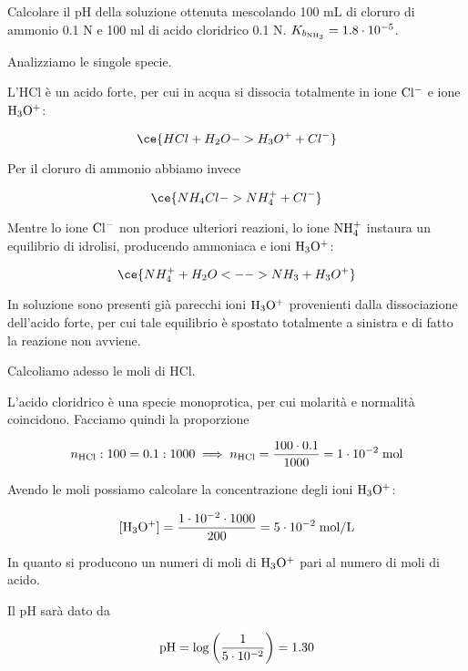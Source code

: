 \begin{esercizio}
    Calcolare il pH della soluzione ottenuta mescolando 100 mL di cloruro di ammonio 0.1 N e 100 ml di acido cloridrico 0.1 N. $K_{b_{\rm NH_3}}=1.8 \cdot 10^{-5}$.
\end{esercizio}
\begin{soluzione}
    Analizziamo le singole specie.

L'HCl è un acido forte, per cui in acqua si dissocia totalmente in ione $\rm Cl^-$ e ione $\rm H_3O^+$:

$$\ce{HCl + H_2O -> H_3O^+ + Cl^-}$$

Per il cloruro di ammonio abbiamo invece

$$\ce{NH_4Cl -> NH_4^+ + Cl^-}$$

Mentre lo ione $\rm Cl^-$ non produce ulteriori reazioni, lo ione $\rm NH_4^+$ instaura un equilibrio di idrolisi, producendo ammoniaca e ioni $\rm H_3O^+$:

$$\ce{NH_4^+ + H_2O <--> NH_3 + H_3O^+}$$

In soluzione sono presenti già parecchi ioni $\rm H_3O^+$ provenienti dalla dissociazione dell'acido forte, per cui tale equilibrio è spostato totalmente a sinistra e di fatto la reazione non avviene.

Calcoliamo adesso le moli di HCl.

L'acido cloridrico è una specie monoprotica, per cui molarità e normalità coincidono. Facciamo quindi la proporzione

$$n_{\rm HCl}:100=0.1:1000
\implies
n_{\rm HCl}=\frac{100 \cdot 0.1}{1000}=1 \cdot 10^{-2} \; \rm mol$$

Avendo le moli possiamo calcolare la concentrazione degli ioni $\rm H_3O^+$:

$$[\rm H_3O^+]=\frac{1 \cdot 10^{-2} \cdot 1000}{200}=5 \cdot 10^{-2} \; mol/L$$

In quanto si producono un numeri di moli di $\rm H_3O^+$ pari al numero di moli di acido.

Il pH sarà dato da

$$\rm pH=\log\left(\frac{1}{5 \cdot 10^{-2}}\right)=1.30$$
\end{soluzione}

\newpage

